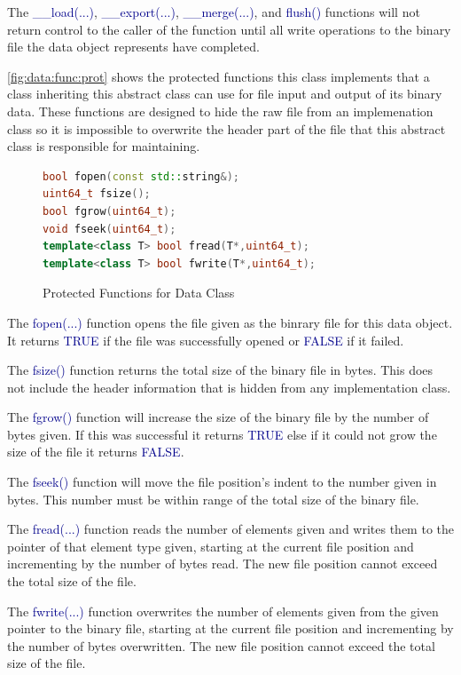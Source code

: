 \documentclass[10pt]{article}
\providecommand{\h}[1]{\textcolor{darkblue}{#1}}
\begin{document}
The \h{\_\_load(...)}, \h{\_\_export(...)}, \h{\_\_merge(...)}, and \h{flush()} 
functions will not return control to the caller of the function until all write 
operations to the binary file the data object represents have completed.

\autoref{fig:data:func:prot} shows the protected functions this class 
implements that a class inheriting this abstract class can use for file input 
and output of its binary data. These functions are designed to hide the raw 
file from an implemenation class so it is impossible to overwrite the header 
part of the file that this abstract class is responsible for maintaining.

\begin{figure}[H]
\begin{mdframed}[style=functions]
\begin{lstlisting}[language=C++]
bool fopen(const std::string&);
uint64_t fsize();
bool fgrow(uint64_t);
void fseek(uint64_t);
template<class T> bool fread(T*,uint64_t);
template<class T> bool fwrite(T*,uint64_t);
\end{lstlisting}
\end{mdframed}
\caption{Protected Functions for Data Class}
\label{fig:data:func:prot}
\end{figure}

The \h{fopen(...)} function opens the file given as the binrary file for this 
data object. It returns \h{TRUE} if the file was successfully opened or 
\h{FALSE} if it failed.

The \h{fsize()} function returns the total size of the binary file in bytes. 
This does not include the header information that is hidden from any 
implementation class.

The \h{fgrow()} function will increase the size of the binary file by the 
number of bytes given. If this was successful it returns \h{TRUE} else if it 
could not grow the size of the file it returns \h{FALSE}.

The \h{fseek()} function will move the file position's indent to the number 
given in bytes. This number must be within range of the total size of the 
binary file.

The \h{fread(...)} function reads the number of elements given and writes them 
to the pointer of that element type given, starting at the current file 
position and incrementing by the number of bytes read. The new file position 
cannot exceed the total size of the file.

The \h{fwrite(...)} function overwrites the number of elements given from the 
given pointer to the binary file, starting at the current file position and 
incrementing by the number of bytes overwritten. The new file position cannot 
exceed the total size of the file.
\end{document}
